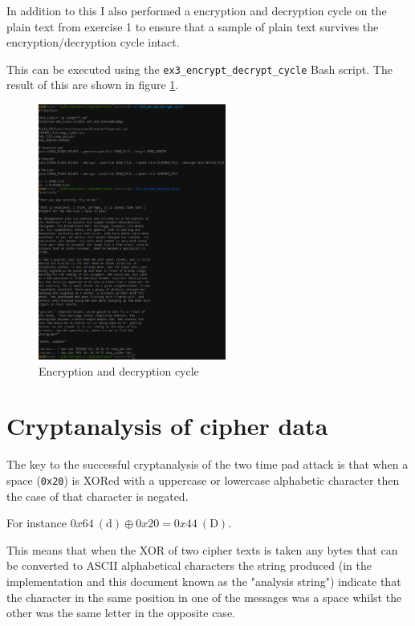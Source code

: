\documentclass[a4paper]{article}
\begin{document}
In addition to this I also performed a encryption and decryption cycle on the
plain text from exercise 1 to ensure that a sample of plain text survives the
encryption/decryption cycle intact.

This can be executed using the \texttt{ex3\_encrypt\_decrypt\_cycle} Bash
script. The result of this are shown in figure \ref{fig:enc_dec_cycle}.

\begin{figure}[h!]
  \centering
  \includegraphics[width=0.55\textwidth]{graphics/ex3_enc_dec_cycle.eps}
  \caption{Encryption and decryption cycle}
  \label{fig:enc_dec_cycle}
\end{figure}

\section{Cryptanalysis of cipher data}

The key to the successful cryptanalysis of the two time pad attack is that when
a space (\texttt{0x20}) is XORed with a uppercase or lowercase alphabetic
character then the case of that character is negated.

For instance $0x64 \  \mathrm{(d)} \oplus 0x20 = 0x44 \  \mathrm{(D)}$.

This means that when the XOR of two cipher texts is taken any bytes that can be
converted to ASCII alphabetical characters the string produced (in the
implementation and this document known as the "analysis string") indicate that
the character in the same position in one of the messages was a space whilst the
other was the same letter in the opposite case.
\end{document}
